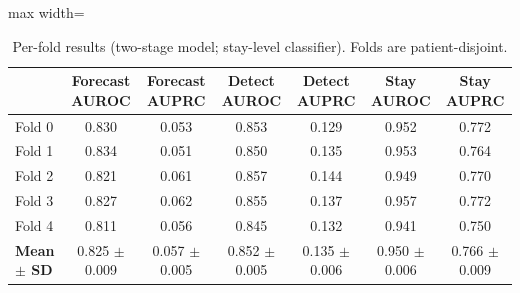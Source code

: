 \begin{table}[!t]
\centering\footnotesize
\caption{Per-fold results (two-stage model; stay-level classifier). Folds are patient-disjoint.}
\label{tab:folds}
\begin{adjustbox}{max width=\linewidth}
\begin{tabular}{lcccccc}
\toprule
 & Forecast AUROC & Forecast AUPRC & Detect AUROC & Detect AUPRC & Stay AUROC & Stay AUPRC \\
\midrule
Fold 0 & 0.830 & 0.053 & 0.853 & 0.129 & 0.952 & 0.772 \\
Fold 1 & 0.834 & 0.051 & 0.850 & 0.135 & 0.953 & 0.764 \\
Fold 2 & 0.821 & 0.061 & 0.857 & 0.144 & 0.949 & 0.770 \\
Fold 3 & 0.827 & 0.062 & 0.855 & 0.137 & 0.957 & 0.772 \\
Fold 4 & 0.811 & 0.056 & 0.845 & 0.132 & 0.941 & 0.750 \\
\midrule
\textbf{Mean $\pm$ SD} & 0.825 $\pm$ 0.009 & 0.057 $\pm$ 0.005 & 0.852 $\pm$ 0.005 & 0.135 $\pm$ 0.006 & 0.950 $\pm$ 0.006 & 0.766 $\pm$ 0.009 \\
\bottomrule
\end{tabular}
\end{adjustbox}
\end{table}
